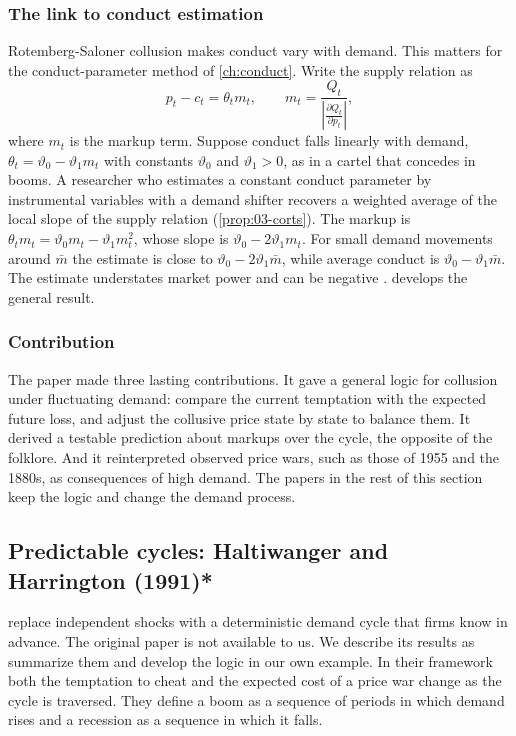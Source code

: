 \subsubsection{The link to conduct estimation}

Rotemberg-Saloner collusion makes conduct vary with demand. This matters for the conduct-parameter method of
\cref{ch:conduct}. Write the supply relation as
\begin{equation*}
p_t - c_t = \theta_t m_t, \qquad m_t = \frac{Q_t}{\left|\frac{\partial Q_t}{\partial p_t}\right|},
\end{equation*}
where $m_t$ is the markup term. Suppose conduct falls linearly with demand, $\theta_t = \vartheta_0 - \vartheta_1 m_t$
with constants $\vartheta_0$ and $\vartheta_1 > 0$, as in a cartel that concedes in booms. A researcher who estimates
a constant conduct parameter by instrumental variables with a demand shifter recovers a weighted average of the local
slope of the supply relation (\cref{prop:03-corts}). The markup is
$\theta_t m_t = \vartheta_0 m_t - \vartheta_1 m_t^2$, whose slope is $\vartheta_0 - 2\vartheta_1 m_t$. For small
demand movements around $\bar m$ the estimate is close to $\vartheta_0 - 2\vartheta_1\bar m$, while average conduct is
$\vartheta_0 - \vartheta_1\bar m$. The estimate understates market power and can be
negative \citep{Corts1999}.  develops the general result.

\subsubsection{Contribution}

The paper made three lasting contributions. It gave a general logic for collusion under fluctuating demand: compare
the current temptation with the expected future loss, and adjust the collusive price state by state to balance them.
It derived a testable prediction about markups over the cycle, the opposite of the folklore. And it reinterpreted
observed price wars, such as those of 1955 and the 1880s, as consequences of high demand. The papers in the rest of
this section keep the logic and change the demand process.

\subsection{Predictable cycles: Haltiwanger and Harrington (1991)*}\label{sec:12-hh}

\citet{HaltiwangerHarrington1991} replace independent shocks with a deterministic demand cycle that firms know in
advance. The original paper is not available to us. We describe its results as \citet[pp.~1--3]{BagwellStaiger1995}
summarize them and develop the logic in our own example. In their framework both the temptation to cheat and the
expected cost of a price war change as the cycle is traversed. They define a boom as a sequence of periods in which
demand rises and a recession as a sequence in which it falls.

